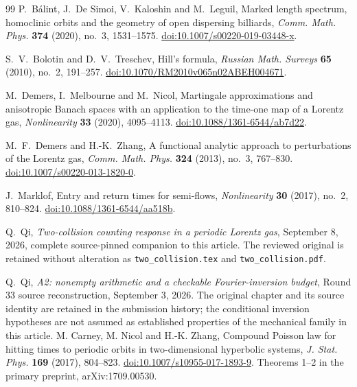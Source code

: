 \begin{thebibliography}{99}
P.~B\'alint, J.~De Simoi, V.~Kaloshin and M.~Leguil,
Marked length spectrum, homoclinic orbits and the geometry of open
dispersing billiards, \emph{Comm. Math. Phys.} \textbf{374} (2020),
no.~3, 1531--1575.
\href{https://doi.org/10.1007/s00220-019-03448-x}{doi:10.1007/s00220-019-03448-x}.

S.~V.~Bolotin and D.~V.~Treschev, Hill's formula,
\emph{Russian Math. Surveys} \textbf{65} (2010), no.~2, 191--257.
\href{https://doi.org/10.1070/RM2010v065n02ABEH004671}{doi:10.1070/RM2010v065n02ABEH004671}.

M.~Demers, I.~Melbourne and M.~Nicol, Martingale approximations and
anisotropic Banach spaces with an application to the time-one map of a
Lorentz gas, \emph{Nonlinearity} \textbf{33} (2020), 4095--4113.
\href{https://doi.org/10.1088/1361-6544/ab7d22}{doi:10.1088/1361-6544/ab7d22}.

M.~F.~Demers and H.-K.~Zhang, A functional analytic approach to
perturbations of the Lorentz gas, \emph{Comm. Math. Phys.}
\textbf{324} (2013), no.~3, 767--830.
\href{https://doi.org/10.1007/s00220-013-1820-0}{doi:10.1007/s00220-013-1820-0}.

J.~Marklof, Entry and return times for semi-flows,
\emph{Nonlinearity} \textbf{30} (2017), no.~2, 810--824.
\href{https://doi.org/10.1088/1361-6544/aa518b}{doi:10.1088/1361-6544/aa518b}.

Q.~Qi, \emph{Two-collision counting response in a periodic Lorentz gas},
September 8, 2026, complete source-pinned companion to this article.
The reviewed original is retained without alteration as
\texttt{two\_collision.tex} and \texttt{two\_collision.pdf}.

Q.~Qi, \emph{A2: nonempty arithmetic and a checkable Fourier-inversion
budget}, Round 33 source reconstruction, September 3, 2026.
The original chapter and its source identity are retained in the
submission history; the conditional inversion hypotheses are not assumed
as established properties of the mechanical family in this article.
M. Carney, M. Nicol and H.-K. Zhang,
Compound Poisson law for hitting times to periodic orbits in two-dimensional
hyperbolic systems, \emph{J. Stat. Phys.} \textbf{169} (2017), 804--823.
\href{https://doi.org/10.1007/s10955-017-1893-9}{doi:10.1007/s10955-017-1893-9}.
Theorems 1--2 in the primary preprint, arXiv:1709.00530.


\end{thebibliography}
